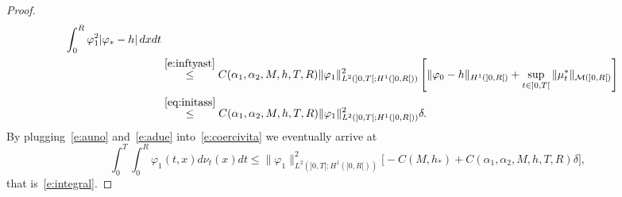 \documentclass[11pt,leqno]{amsart}
\numberwithin{equation}{section}
\begin{document}
\begin{proof}
\begin{equation}
\begin{split}
\int_0^R  {\varphi}_1^2 |{\varphi}_\ast - h|  \, dx dt
  \\
  & \stackrel{\eqref{e:inftyast}}{\leq} 
  C(\alpha_1, \alpha_2, M, h, T, R) 
  \| {\varphi}_1 \|^2_{L^2 (  ]0, T[; H^1 (]0, R[))}
  \left[ 
     \| {\varphi}_0 - h \|_{H^1 (]0, R[)}+
     \sup_{t \in ]0, T[} 
     \| \mu_t^\ast \|_{\mathcal M (]0, R[)}  \right] \\
     & \stackrel{\eqref{eq:initass}}{\leq}
   C(\alpha_1, \alpha_2, M, h, T, R) 
  \| {\varphi}_1 \|^2_{L^2 (  ]0, T[; H^1 (]0, R[))} \delta.     
\end{split}
\end{equation}
By plugging~\eqref{e:auno} and~\eqref{e:adue} into~\eqref{e:coercivita} we eventually arrive at 
$$
   \int_0^T  \! \! \int_0^R {\varphi}_1(t,x) d\nu_t(x)dt 
\leq  \| {\varphi}_1 \|^2_{L^2 (  ]0, T[; H^1 (]0, R[))} 
\Big[ 
- C(M, h_\ast) +  C(\alpha_1, \alpha_2, M, h, T, R)  \delta
\Big],
$$ 
that is~\eqref{e:integral}. \end{proof}
\end{document}
